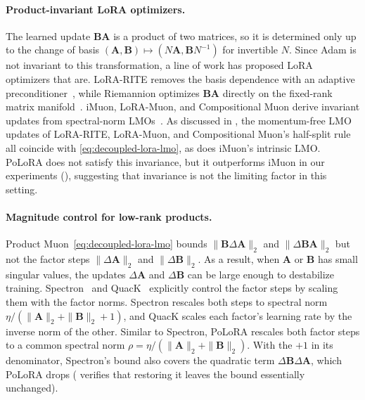 \documentclass[11pt]{article}
\newcommand{\mat}[1]{\bm{#1}}
\newcommand{\norm}[1]{\| #1\|}
\newcommand{\methodname}{PoLoRA\xspace}
\begin{document}
\paragraph{Product-invariant LoRA optimizers.}
The learned update $\mat{B}\mat{A}$ is a product of two matrices, so it is determined only up to the
change of basis $(\mat{A},\mat{B})\mapsto(N\mat{A},\mat{B}N^{-1})$ for invertible $N$. Since Adam is not invariant
to this transformation, a line of work has proposed LoRA optimizers that are. LoRA-RITE
removes the basis dependence with an adaptive preconditioner~\cite{lorarite}, while Riemannion
optimizes $\mat{B}\mat{A}$ directly on the fixed-rank matrix manifold~\cite{riemannion}. iMuon, LoRA-Muon, and Compositional Muon derive invariant updates from
spectral-norm LMOs~\cite{imuon,loramuon,tilde_csd}. As discussed in , the momentum-free LMO updates of LoRA-RITE, LoRA-Muon,
and Compositional Muon's half-split rule all coincide with \eqref{eq:decoupled-lora-lmo}, as does iMuon's intrinsic LMO. \methodname{} does not satisfy this invariance, but it outperforms iMuon in our experiments (), suggesting that invariance is not the limiting factor in this setting.

\paragraph{Magnitude control for low-rank products.}
Product Muon~\eqref{eq:decoupled-lora-lmo} bounds $\norm{\mat{B}\Delta\mat{A}}_2$ and $\norm{\Delta\mat{B} \mat{A}}_2$ but not the factor steps $\norm{\Delta\mat{A}}_2$ and $\norm{\Delta\mat{B}}_2$. As a result, when $\mat{A}$ or $\mat{B}$ has small singular values, the updates $\Delta\mat{A}$ and $\Delta\mat{B}$ can be large enough to destabilize training. Spectron~\cite{spectron} and QuacK~\cite{quack} explicitly control the factor steps by scaling them with the factor norms. Spectron rescales both steps to spectral norm $\eta/(\norm{\mat{A}}_2+\norm{\mat{B}}_2+1)$, and QuacK scales each factor's learning rate by the inverse norm of the other. Similar to Spectron, \methodname{} rescales both factor steps to a common spectral norm $\rho=\eta/(\norm{\mat{A}}_2+\norm{\mat{B}}_2)$. With the $+1$ in its denominator, Spectron's bound also covers the quadratic term $\Delta\mat{B} \Delta\mat{A}$, which \methodname{} drops ( verifies that restoring it leaves the bound essentially unchanged).

\end{document}
